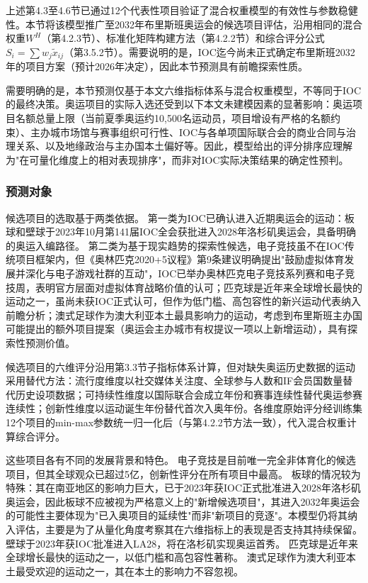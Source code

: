 \documentclass[twoside]{CUGThesis}
\begin{document}
上述第4.3至4.6节已通过12个代表性项目验证了混合权重模型的有效性与参数稳健性。本节将该模型推广至2032年布里斯班奥运会的候选项目评估，沿用相同的混合权重$W^H$（第4.2.3节）、标准化矩阵构建方法（第4.2.2节）和综合评分公式$S_i = \sum w_j \tilde{x}_{ij}$（第3.5.2节）。需要说明的是，IOC迄今尚未正式确定布里斯班2032年的项目方案（预计2026年决定）\cite{IOC2023}，因此本节预测具有前瞻探索性质。

需要明确的是，本节预测仅基于本文六维指标体系与混合权重模型，不等同于IOC的最终决策。奥运项目的实际入选还受到以下本文未建模因素的显著影响：奥运项目名额总量上限（当前夏季奥运约10,500名运动员，项目增设有严格的名额约束）、主办城市场馆与赛事组织可行性、IOC与各单项国际联合会的商业合同与治理关系、以及地缘政治与主办国本土偏好等。因此，模型给出的评分排序应理解为"在可量化维度上的相对表现排序"，而非对IOC实际决策结果的确定性预判。

\subsubsection{预测对象}

候选项目的选取基于两类依据。
第一类为IOC已确认进入近期奥运会的运动：板球和壁球于2023年10月第141届IOC全会获批进入2028年洛杉矶奥运会\cite{IOC2023}，具备明确的奥运入编路径。
第二类为基于现实趋势的探索性候选，电子竞技虽不在IOC传统项目框架内，但《奥林匹克2020+5议程》第9条建议明确提出"鼓励虚拟体育发展并深化与电子游戏社群的互动"，IOC已举办奥林匹克电子竞技系列赛和电子竞技周\cite{IOC2023}，表明官方层面对虚拟体育战略价值的认可；匹克球是近年来全球增长最快的运动之一，虽尚未获IOC正式认可，但作为低门槛、高包容性的新兴运动代表纳入前瞻分析；澳式足球作为澳大利亚本土最具影响力的运动，考虑到布里斯班主办国可能提出的额外项目提案（奥运会主办城市有权提议一项以上新增运动\cite{IOC2023}），具有探索性预测价值。

候选项目的六维评分沿用第3.3节子指标体系计算，但对缺失奥运历史数据的运动采用替代方法：流行度维度以社交媒体关注度、全球参与人数和IF会员国数量替代历史设项数据；可持续性维度以国际联合会成立年份和赛事连续性替代奥运参赛连续性；创新性维度以运动诞生年份替代首次入奥年份。各维度原始评分经训练集12个项目的min-max参数统一归一化后（与第4.2.2节方法一致），代入混合权重计算综合评分。

这些项目各有不同的发展背景和特色。
电子竞技是目前唯一完全非体育化的候选项目，但其全球观众已超过5亿，创新性评分在所有项目中最高。
板球的情况较为特殊：其在南亚地区的影响力巨大，已于2023年获IOC正式批准进入2028年洛杉矶奥运会\cite{IOC2023}，因此板球不应被视为严格意义上的"新增候选项目"，其进入2032年奥运会的可能性主要体现为"已入奥项目的延续性"而非"新项目的竞逐"。本模型仍将其纳入评估，主要是为了从量化角度考察其在六维指标上的表现是否支持其持续保留。
壁球于2023年获IOC批准进入LA28，将在洛杉矶实现奥运首秀\cite{IOC2023}。
匹克球是近年来全球增长最快的运动之一，以低门槛和高包容性著称。
澳式足球作为澳大利亚本土最受欢迎的运动之一，其在本土的影响力不容忽视。
\end{document}
